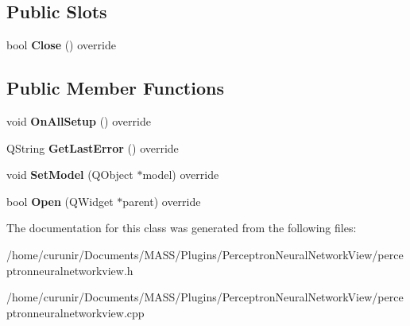 \subsection*{Public Slots}
\begin{DoxyCompactItemize}
\item 
bool {\bfseries Close} () override\hypertarget{class_perceptron_network_view_plugin_a0b926a5f59e199142cb3a6bd2fc58e2d}{}\label{class_perceptron_network_view_plugin_a0b926a5f59e199142cb3a6bd2fc58e2d}

\end{DoxyCompactItemize}
\subsection*{Public Member Functions}
\begin{DoxyCompactItemize}
\item 
void {\bfseries On\+All\+Setup} () override\hypertarget{class_perceptron_network_view_plugin_ace8ae52e9cd4093ffc637e5b19a446ff}{}\label{class_perceptron_network_view_plugin_ace8ae52e9cd4093ffc637e5b19a446ff}

\item 
Q\+String {\bfseries Get\+Last\+Error} () override\hypertarget{class_perceptron_network_view_plugin_aa4942c85bb0eb6001b23dda5eee1d36b}{}\label{class_perceptron_network_view_plugin_aa4942c85bb0eb6001b23dda5eee1d36b}

\item 
void {\bfseries Set\+Model} (Q\+Object $\ast$model) override\hypertarget{class_perceptron_network_view_plugin_af997cf5ec39e674207d48c506f6ac804}{}\label{class_perceptron_network_view_plugin_af997cf5ec39e674207d48c506f6ac804}

\item 
bool {\bfseries Open} (Q\+Widget $\ast$parent) override\hypertarget{class_perceptron_network_view_plugin_a33791a775a8ac09f54a8c35905efe1cd}{}\label{class_perceptron_network_view_plugin_a33791a775a8ac09f54a8c35905efe1cd}

\end{DoxyCompactItemize}


The documentation for this class was generated from the following files\+:\begin{DoxyCompactItemize}
\item 
/home/curunir/\+Documents/\+M\+A\+S\+S/\+Plugins/\+Perceptron\+Neural\+Network\+View/perceptronneuralnetworkview.\+h\item 
/home/curunir/\+Documents/\+M\+A\+S\+S/\+Plugins/\+Perceptron\+Neural\+Network\+View/perceptronneuralnetworkview.\+cpp\end{DoxyCompactItemize}

